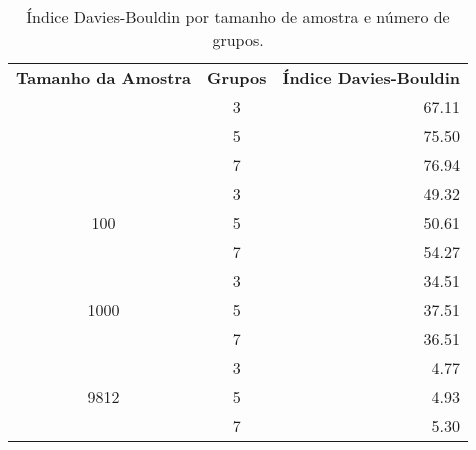 \begin{table}[htbp]
\centering
\begin{tabular}{|c|c|r|}
  \hline
	\textbf{Tamanho da Amostra} & \textbf{Grupos} & \textbf{Índice Davies-Bouldin} \\ 
  \hhline{|=|=|=|}
	\multirow{3}{*}{10} 	& 3 & 67.11 \\ \cline{2-3}
												& 5 & 75.50 \\ \cline{2-3}
												& 7 & 76.94 \\ \hline
  \multirow{3}{*}{100} 	& 3 & 49.32 \\ \cline{2-3}
												& 5 & 50.61 \\ \cline{2-3}
												& 7 & 54.27 \\ \hline
  \multirow{3}{*}{1000} & 3 & 34.51 \\ \cline{2-3}
												& 5 & 37.51 \\ \cline{2-3}
												& 7 & 36.51 \\ \hline
  \multirow{3}{*}{9812} & 3 & 4.77  \\ \cline{2-3}
												& 5 & 4.93  \\ \cline{2-3}
												& 7 & 5.30  \\ \hline
\end{tabular}
\caption{Índice Davies-Bouldin por tamanho de amostra e número de grupos.} 
\label{tab:indice_db}
\end{table}
